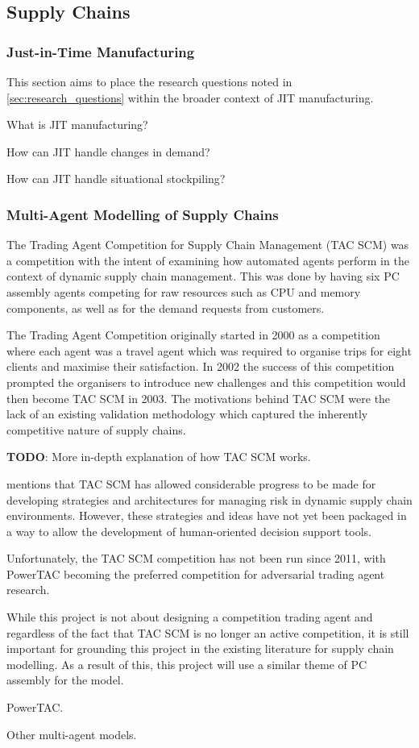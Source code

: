 \subsection{Supply Chains}

\subsubsection{Just-in-Time Manufacturing}

This section aims to place the research questions noted in \cref{sec:research_questions} within the broader context of JIT manufacturing.

What is JIT manufacturing?

How can JIT handle changes in demand?

How can JIT handle situational stockpiling?

\subsubsection{Multi-Agent Modelling of Supply Chains}

The Trading Agent Competition for Supply Chain Management (TAC SCM) was a competition with the intent of examining how automated agents perform in the context of dynamic supply chain management.
This was done by having six PC assembly agents competing for raw resources such as CPU and memory components, as well as for the demand requests from customers.~\cite{sadeh2003tac}

The Trading Agent Competition originally started in 2000 as a competition where each agent was a travel agent which was required to organise trips for eight clients and maximise their satisfaction.
In 2002 the success of this competition prompted the organisers to introduce new challenges and this competition would then become TAC SCM in 2003.
The motivations behind TAC SCM were the lack of an existing validation methodology which captured the inherently competitive nature of supply chains.~\cite{arunachalam2005supply}

\textbf{TODO}: More in-depth explanation of how TAC SCM works.~\cite{arunachalam2005supply}

 mentions that TAC SCM has allowed considerable progress to be made for developing strategies and architectures for managing risk in dynamic supply chain environments.
However, these strategies and ideas have not yet been packaged in a way to allow the development of human-oriented decision support tools.

Unfortunately, the TAC SCM competition has not been run since 2011, with PowerTAC becoming the preferred competition for adversarial trading agent research.

While this project is not about designing a competition trading agent and regardless of the fact that TAC SCM is no longer an active competition, it is still important for grounding this project in the existing literature for supply chain modelling.
As a result of this, this project will use a similar theme of PC assembly for the model.

PowerTAC\@.

Other multi-agent models.
